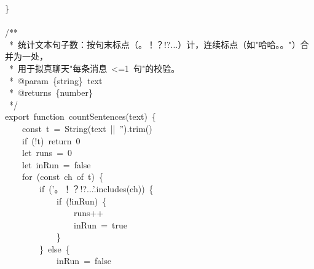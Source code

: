 \documentclass[a4paper,10pt]{article}
\begin{document}
{\}\\
\mbox{}\\
/**\\
~*~统计文本句子数：按句末标点（。！？!?...）计，连续标点（如"哈哈。。"）合并为一处，\\
~*~用于拟真聊天"每条消息~<=1~句"的校验。\\
~*~@param~\{string\}~text\\
~*~@returns~\{number\}\\
~*/\\
export~function~countSentences(text)~\{\\
~~~~const~t~=~String(text~||~'').trim()\\
~~~~if~(!t)~return~0\\
~~~~let~runs~=~0\\
~~~~let~inRun~=~false\\
~~~~for~(const~ch~of~t)~\{\\
~~~~~~~~if~('。！？!?...'.includes(ch))~\{\\
~~~~~~~~~~~~if~(!inRun)~\{\\
~~~~~~~~~~~~~~~~runs++\\
~~~~~~~~~~~~~~~~inRun~=~true\\
~~~~~~~~~~~~\}\\
~~~~~~~~\}~else~\{\\
~~~~~~~~~~~~inRun~=~false
}

\newpage
\end{document}
